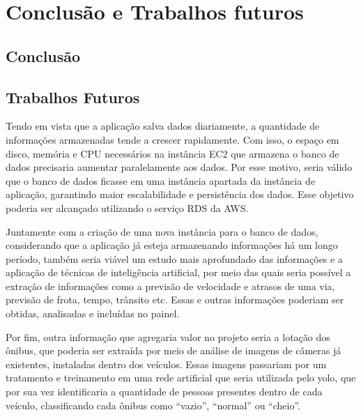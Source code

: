 \chapter{Conclusão e Trabalhos futuros}
\label{Cap:Conclusoes}

\section{Conclusão}
\section{Trabalhos Futuros}
\indent
\par Tendo em vista que a aplicação salva dados diariamente, a quantidade de informações armazenadas tende a crescer rapidamente. Com isso, o espaço em disco, memória e CPU necessários na instância EC2 que armazena o banco de dados precisaria aumentar paralelamente aos dados. Por esse motivo, seria válido que o banco de dados ficasse em uma instância apartada da instância de aplicação, garantindo maior escalabilidade e persistência dos dados. Esse objetivo poderia ser alcançado utilizando o serviço RDS da AWS.
\indent
\par Juntamente com a criação de uma nova instância para o banco de dados, considerando que a aplicação já esteja armazenando informações há um longo período, também seria viável um estudo mais aprofundado das informações e a aplicação de técnicas de inteligência artificial, por meio das quais seria possível a extração de informações como a previsão de velocidade e atrasos de uma via, previsão de frota, tempo, trânsito etc. Essas e outras informações poderiam ser obtidas, analisadas e incluídas no painel.
\indent
\par Por fim, outra informação que agregaria valor no projeto seria a lotação dos ônibus, que poderia ser extraída por meio de análise de imagens de câmeras já existentes, instaladas dentro dos veículos. Essas imagens passariam por um tratamento e treinamento em uma rede artificial que seria utilizada pelo yolo, que por sua vez identificaria a quantidade de pessoas presentes dentro de cada veículo, classificando cada ônibus como “vazio”, “normal” ou “cheio”.




